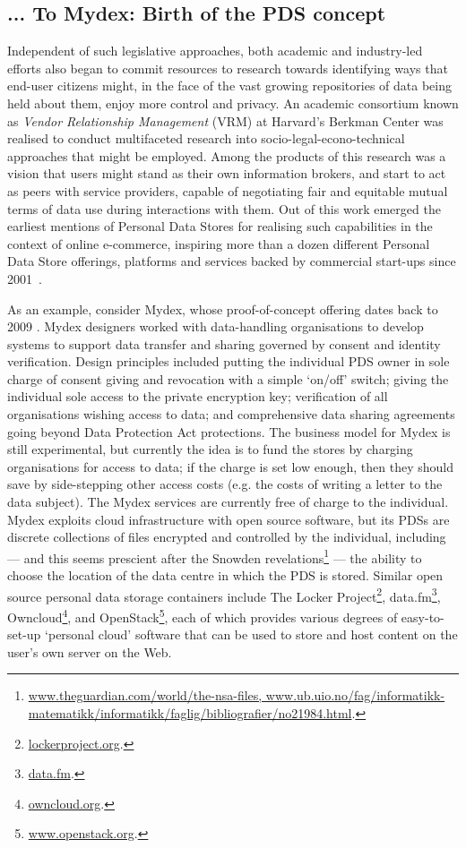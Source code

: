 \documentclass[graybox]{svmult}
\begin{document}
\subsection{... To Mydex: Birth of the PDS concept}

Independent of such legislative approaches, both academic and industry-led efforts also began to commit resources to research towards identifying ways that end-user citizens might, in the face of the vast growing repositories of data being held about them, enjoy more control and privacy. An academic consortium known as \emph{Vendor Relationship Management} (VRM) at Harvard's Berkman Center was realised to conduct multifaceted research into socio-legal-econo-technical approaches that might be employed.  Among the products of this research was a vision that users might stand as their own information brokers, and start to act as peers with service providers, capable of negotiating fair and equitable mutual terms of data use during interactions with them\cite{agustin2001vendor}.  Out of this work emerged the earliest mentions of Personal Data Stores for realising such capabilities in the context of online e-commerce, inspiring more than a dozen different Personal Data Store offerings, platforms and services backed by commercial start-ups since 2001~\cite{ctrlshift}. 

As an example, consider Mydex, whose proof-of-concept offering dates back to 2009 \cite{heath2013}. Mydex designers worked with data-handling organisations to develop systems to support data transfer and sharing governed by consent and identity verification. Design principles included putting the individual PDS owner in sole charge of consent giving and revocation with a simple `on/off’ switch; giving the individual sole access to the private encryption key; verification of all organisations wishing access to data; and comprehensive data sharing agreements going beyond Data Protection Act protections. The business model for Mydex is still experimental, but currently the idea is to fund the stores by charging organisations for access to data; if the charge is set low enough, then they should save by side-stepping other access costs (e.g. the costs of writing a letter to the data subject). The Mydex services are currently free of charge to the individual. Mydex exploits cloud infrastructure with open source software, but  its PDSs are discrete collections of files encrypted and controlled by the individual, including --- and this seems prescient after the Snowden revelations\footnote{\url{www.theguardian.com/world/the-nsa-files, www.ub.uio.no/fag/informatikk-matematikk/informatikk/faglig/bibliografier/no21984.html}.} --- the ability to choose the location of the data centre in which the PDS is stored. Similar open source personal data storage containers include The Locker Project\footnote{\url{lockerproject.org}.}, data.fm\footnote{\url{data.fm}.}, Owncloud\footnote{\url{owncloud.org}.}, and OpenStack\footnote{\url{www.openstack.org}.}, each of which provides various degrees of easy-to-set-up `personal cloud’ software that can be used to
store and host content on the user's own server on the Web.
\end{document}
